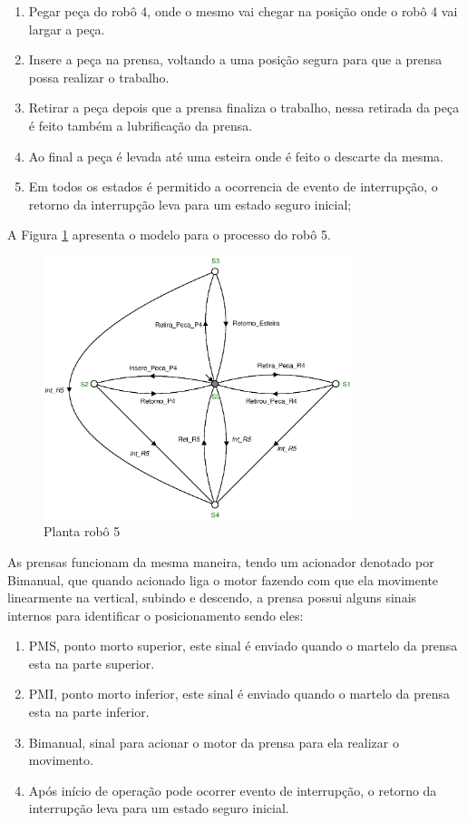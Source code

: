\begin{enumerate}
  \item Pegar peça do robô 4, onde o mesmo vai chegar na posição onde o robô 4 vai largar a peça.
  \item Insere a peça na prensa, voltando a uma posição segura para que a prensa possa realizar o trabalho.
  \item Retirar a peça depois que a prensa finaliza o trabalho, nessa retirada da peça é feito também a lubrificação da prensa.
  \item Ao final a peça é levada até uma esteira onde é feito o descarte da mesma.
  \item Em todos os estados é permitido a ocorrencia de evento de interrupção, o retorno da interrupção leva para um estado seguro inicial;
\end{enumerate}

A Figura \ref{fig:robo5} apresenta o modelo para o processo do robô 5.

\begin{figure}[H]%
    \centering
    \includegraphics[width=0.8\textwidth]{imagens/robo_5.eps}
    \caption{Planta robô 5}\label{fig:robo5}
\end{figure}

As prensas funcionam da mesma maneira, tendo um acionador denotado por Bimanual, que quando acionado liga o motor fazendo com que ela movimente linearmente na vertical, subindo e descendo, a prensa possui alguns sinais internos para identificar o posicionamento sendo eles:

\begin{enumerate}
  \item PMS, ponto morto superior, este sinal é enviado quando o martelo da prensa esta na parte superior.
  \item PMI, ponto morto inferior, este sinal é enviado quando o martelo da prensa esta na parte inferior.
  \item Bimanual, sinal para acionar o motor da prensa para ela realizar o movimento.
  \item Após início de operação pode ocorrer evento de interrupção, o retorno da interrupção leva para um estado seguro inicial.
\end{enumerate}


